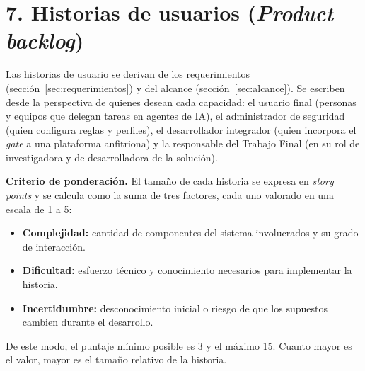 \documentclass[
11pt, %
]{charter}
\begin{document}
\section{7. Historias de usuarios (\textit{Product backlog})}
\label{sec:backlog}

Las historias de usuario se derivan de los requerimientos (sección~\ref{sec:requerimientos}) y del alcance (sección~\ref{sec:alcance}). Se escriben desde la perspectiva de quienes desean cada capacidad: el usuario final (personas y equipos que delegan tareas en agentes de IA), el administrador de seguridad (quien configura reglas y perfiles), el desarrollador integrador (quien incorpora el \textit{gate} a una plataforma anfitriona) y la responsable del Trabajo Final (en su rol de investigadora y de desarrolladora de la solución).

\textbf{Criterio de ponderación.} El tamaño de cada historia se expresa en \textit{story points} y se calcula como la suma de tres factores, cada uno valorado en una escala de 1 a 5:
\begin{itemize}
	\item \textbf{Complejidad:} cantidad de componentes del sistema involucrados y su grado de interacción.
	\item \textbf{Dificultad:} esfuerzo técnico y conocimiento necesarios para implementar la historia.
	\item \textbf{Incertidumbre:} desconocimiento inicial o riesgo de que los supuestos cambien durante el desarrollo.
\end{itemize}
De este modo, el puntaje mínimo posible es 3 y el máximo 15. Cuanto mayor es el valor, mayor es el tamaño relativo de la historia.
\end{document}
